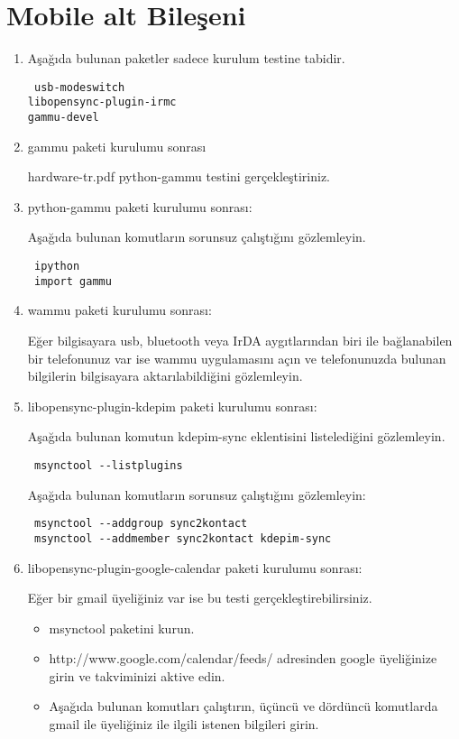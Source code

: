 \documentclass[a4paper,10pt]{article}
\begin{document}
\section{Mobile alt Bileşeni}
\begin{enumerate}
\item Aşağıda bulunan paketler sadece kurulum testine tabidir.
\begin{verbatim}
 usb-modeswitch
libopensync-plugin-irmc
gammu-devel
\end{verbatim}

\item gammu paketi kurulumu sonrası

hardware-tr.pdf python-gammu testini gerçekleştiriniz.

\item python-gammu paketi kurulumu sonrası:

Aşağıda bulunan komutların sorunsuz çalıştığını gözlemleyin.

\begin{verbatim}
 ipython
 import gammu
\end{verbatim}


\item wammu paketi kurulumu sonrası:

Eğer bilgisayara usb, bluetooth veya IrDA aygıtlarından biri ile bağlanabilen bir telefonunuz var ise wammu uygulamasını açın ve telefonunuzda bulunan bilgilerin bilgisayara aktarılabildiğini gözlemleyin.

\item libopensync-plugin-kdepim paketi kurulumu sonrası:

Aşağıda bulunan komutun kdepim-sync eklentisini listelediğini gözlemleyin.
\begin{verbatim}
 msynctool --listplugins
\end{verbatim}

Aşağıda bulunan komutların sorunsuz çalıştığını gözlemleyin:

\begin{verbatim}
 msynctool --addgroup sync2kontact
 msynctool --addmember sync2kontact kdepim-sync
\end{verbatim}


 \item libopensync-plugin-google-calendar paketi kurulumu sonrası:

Eğer bir gmail üyeliğiniz var ise bu testi gerçekleştirebilirsiniz.
\begin{itemize}
 \item msynctool paketini kurun.
 \item http://www.google.com/calendar/feeds/ adresinden google üyeliğinize girin ve takviminizi aktive edin.
 \item Aşağıda bulunan komutları çalıştırın, üçüncü ve dördüncü komutlarda gmail ile üyeliğiniz ile ilgili istenen bilgileri girin.


\end{itemize}
\end{enumerate}
\end{document}
